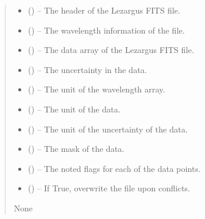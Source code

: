 \documentclass[letterpaper,11pt,english]{sphinxmanual}
\begin{document}
\begin{savenotes}
\begin{fulllineitems}
\begin{quote}
\begin{description}
\begin{itemize}
\item {} 
\sphinxAtStartPar
{} () – The header of the Lezargus FITS file.

\item {} 
\sphinxAtStartPar
{} () – The wavelength information of the file.

\item {} 
\sphinxAtStartPar
{} () – The data array of the Lezargus FITS file.

\item {} 
\sphinxAtStartPar
{} () – The uncertainty in the data.

\item {} 
\sphinxAtStartPar
{} () – The unit of the wavelength array.

\item {} 
\sphinxAtStartPar
{} () – The unit of the data.

\item {} 
\sphinxAtStartPar
{} () – The unit of the uncertainty of the data.

\item {} 
\sphinxAtStartPar
{} () – The mask of the data.

\item {} 
\sphinxAtStartPar
{} () – The noted flags for each of the data points.

\item {} 
\sphinxAtStartPar
{} (\sphinxstyleliteralemphasis{\sphinxupquote{, }}) – If True, overwrite the file upon conflicts.

\end{itemize}

\sphinxAtStartPar
None

\end{description}\end{quote}

\end{fulllineitems}\end{savenotes}
\end{document}
